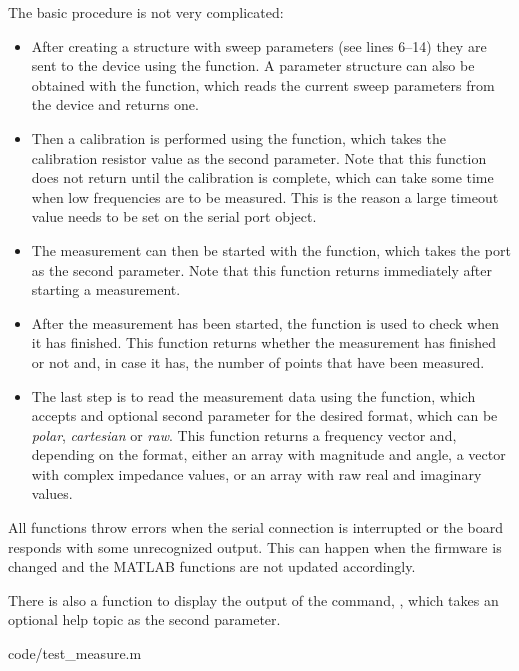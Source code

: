 The basic procedure is not very complicated:
\begin{itemize}
	\item After creating a structure with sweep parameters (see lines 6--14) they are sent to the device using the
     function. A parameter structure can also be obtained with the  function,
    which reads the current sweep parameters from the device and returns one.
  \item Then a calibration is performed using the  function, which takes the calibration resistor
    value as the second parameter. Note that this function does not return until the calibration is complete, which
    can take some time when low frequencies are to be measured. This is the reason a large timeout value needs to be
    set on the serial port object.
  \item The measurement can then be started with the  function, which takes the port as the second
    parameter. Note that this function returns immediately after starting a measurement.
  \item After the measurement has been started, the  function is used to check when it has finished.
    This function returns whether the measurement has finished or not and, in case it has, the number of points that
    have been measured.
  \item The last step is to read the measurement data using the  function, which accepts and optional
    second parameter for the desired format, which can be \emph{polar}, \emph{cartesian} or \emph{raw}. This function
    returns a frequency vector and, depending on the format, either an array with magnitude and angle, a vector with
    complex impedance values, or an array with raw real and imaginary values.
\end{itemize}

All functions throw errors when the serial connection is interrupted or the board responds with some unrecognized
output. This can happen when the firmware is changed and the MATLAB functions are not updated accordingly.

There is also a function to display the output of the  command, , which takes an
optional help topic as the second parameter.


  {code/test_measure.m}

